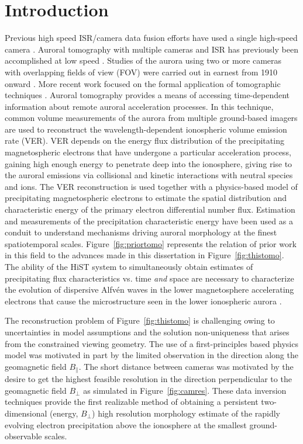 \section{Introduction}

Previous high speed ISR/camera data fusion efforts have used a single high-speed camera \citep{semeter2008,akbari2013,dahlgren2013}.
Auroral tomography with multiple cameras and ISR has previously been accomplished at low speed \citep{bjornthesis,wedlund2013}.
Studies of the aurora using two or more cameras with overlapping fields of view (FOV) were carried out in earnest from 1910 onward \citep{stormer1930}.
More recent work focused on the formal application of tomographic techniques \citep{frey1996,doe1997,bjorn1998,semeter1999,hirsch2016}.
Auroral tomography provides a means of accessing time-dependent information about remote auroral acceleration processes.
In this technique, common volume measurements of the aurora from multiple ground-based imagers are used to reconstruct the wavelength-dependent ionospheric volume emission rate (VER).
VER depends on the energy flux distribution of the precipitating magnetospheric electrons that have undergone a particular acceleration process, gaining high enough energy to penetrate deep into the ionosphere, giving rise to the auroral emissions via collisional and kinetic interactions with neutral species and ions.
The VER reconstruction is used together with a physics-based model of precipitating magnetospheric electrons to estimate the spatial distribution and characteristic energy of the primary electron differential number flux.
Estimation and measurements of the precipitation characteristic energy have been used \citep{chaston2003,mcfadden1999} as a conduit to understand mechanisms driving auroral morphology at the finest spatiotemporal scales.
Figure~\ref{fig:priortomo} represents the relation of prior work in this field to the advances made in this dissertation in Figure~\ref{fig:thistomo}.
The ability of the HiST system to simultaneously obtain estimates of precipitating flux characteristics vs. time \textit{and} space \citep{hirsch2016} are necessary to characterize the evolution of dispersive Alfvén waves in the lower magnetosphere accelerating electrons that cause the microstructure seen in the lower ionospheric aurora \citep{semeter2012}.



The reconstruction problem of Figure~\ref{fig:thistomo} is challenging owing to uncertainties in model assumptions and the solution non-uniqueness that arises from the constrained viewing geometry.
The use of a first-principles based physics model was motivated in part by the limited observation in the direction along the geomagnetic field $B_\parallel$.
The short distance between cameras was motivated by the desire to get the highest feasible resolution in the direction perpendicular to the geomagnetic field $B_\perp$ as simulated in Figure~\ref{fig:camres}.
These data inversion techniques provide the first realizable method of obtaining a persistent two-dimensional (energy, $B_\perp$) high resolution morphology estimate of the rapidly evolving electron precipitation above the ionosphere at the smallest ground-observable scales.

